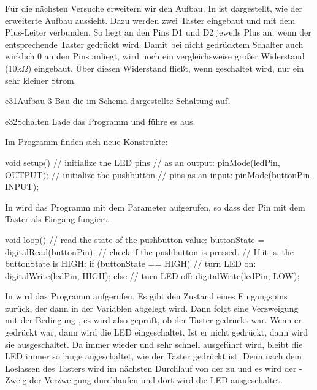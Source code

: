 \newpage{}
%
%
%
Für die nächsten Versuche erweitern wir den Aufbau. In  ist dargestellt, wie der erweiterte Aufbau aussieht. 
Dazu werden zwei Taster eingebaut und mit dem Plus-Leiter verbunden. So liegt an den Pins D1 und D2 jeweils Plus an,
wenn der entsprechende Taster gedrückt wird. Damit bei nicht gedrücktem Schalter auch wirklich 0 an den Pins anliegt,
wird noch ein vergleichsweise großer Widerstand (10k$\Omega$) eingebaut. Über diesen Widerstand fließt, wenn geschaltet wird,
nur ein sehr kleiner Strom.
\begin{excercise}{e31}{Aufbau 3}
Bau die im Schema  dargestellte Schaltung auf!
\end{excercise}

\begin{excercise}{e32}{Schalten}
Lade das Programm  und führe es aus.
\end{excercise}

Im Programm  finden sich neue Konstrukte:

\begin{src}
void setup() {
  // initialize the LED pins 
  // as an output:
  pinMode(ledPin, OUTPUT);
  // initialize the pushbutton 
  // pins as an input:
  pinMode(buttonPin, INPUT);
}
\end{src}

In  wird das Programm  mit dem Parameter  aufgerufen,
so dass der Pin mit dem Taster als Eingang fungiert.

\vfill\null\pagebreak

\begin{src}
void loop() {
  // read the state of the pushbutton value:
  buttonState = 
    digitalRead(buttonPin);
  // check if the pushbutton is pressed. 
  // If it is, the buttonState is HIGH:
  if (buttonState == HIGH) {
    // turn LED on:
    digitalWrite(ledPin, HIGH);
  } else {
    // turn LED off:
    digitalWrite(ledPin, LOW);
  }
}
\end{src}

In  wird das Programm  aufgerufen.
Es gibt den Zustand eines Eingangspins zurück, der dann in der
Variablen  abgelegt wird.
Dann folgt eine Verzweigung mit der Bedingung ,
es wird also geprüft, ob der Taster gedrückt war.
Wenn er gedrückt war, dann wird die LED eingeschaltet. Ist er nicht 
gedrückt, dann wird sie ausgeschaltet.
Da  immer wieder und sehr schnell ausgeführt wird, bleibt die
LED immer so lange angeschaltet, wie der Taster gedrückt ist. Denn
nach dem Loslassen des Tasters wird im nächsten Durchlauf von 
der  zu  und es wird der -Zweig der
Verzweigung durchlaufen und dort wird die LED ausgeschaltet.


